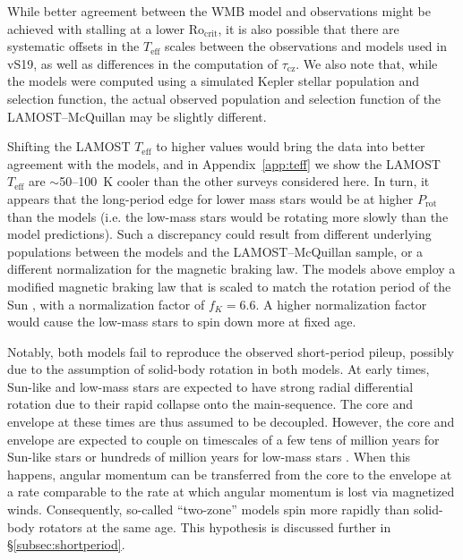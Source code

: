 \documentclass[trackchanges,twocolumn]{aastex631}
\newcommand{\taucz}{$\tau_\mathrm{cz}$\xspace}
\newcommand{\rocrit}{$\mathrm{Ro_{crit}}$\xspace}
\newcommand{\lamostmcq}{LAMOST--McQuillan\xspace}
\newcommand{\jvs}{vS19\xspace}
\newcommand{\teff}{\ensuremath{T_{\mathrm{eff}}}\xspace}
\newcommand{\prot}{\ensuremath{P_\mathrm{rot}}\xspace}
\begin{document}
While better agreement between the WMB model and observations might be achieved with stalling at a lower \rocrit, it is also possible that there are systematic offsets in the \teff scales between the observations and models used in \jvs, as well as differences in the computation of \taucz.  We also note that, while the models were computed using a simulated Kepler stellar population and selection function, the actual observed population and selection function of the \lamostmcq may be slightly different. 

Shifting the LAMOST \teff to higher values would bring the data into better agreement with the models, and in Appendix~\ref{app:teff} we show the LAMOST \teff are $\sim$50--100~K cooler than the other surveys considered here. In turn, it appears that the long-period edge for lower mass stars would be at higher \prot than the models (i.e. the low-mass stars would be rotating more slowly than the model predictions). Such a discrepancy could result from different underlying populations between the models and the \lamostmcq sample, or a different normalization for the magnetic braking law. The models above employ a modified magnetic braking law that is scaled to match the rotation period of the Sun \citep[see equations 1 \& 2 of][]{vanSaders2013}, with a normalization factor of $f_K = 6.6$. A higher normalization factor would cause the low-mass stars to spin down more at fixed age.

Notably, both models fail to reproduce the observed short-period pileup, possibly due to the assumption of solid-body rotation in both models. At early times, Sun-like and low-mass stars are expected to have strong radial differential rotation due to their rapid collapse onto the main-sequence. The core and envelope at these times are thus assumed to be decoupled. However, the core and envelope are expected to couple on timescales of a few tens of million years for Sun-like stars \citep{Denissenkov2010, GalletBouvier2015, Lanzafame2015} or hundreds of million years for low-mass stars \citep{GalletBouvier2015,Lanzafame2015,Somers2016}. When this happens, angular momentum can be transferred from the core to the envelope at a rate comparable to the rate at which angular momentum is lost via magnetized winds. Consequently, so-called ``two-zone'' models \citep{MacGregor1991} spin more rapidly than solid-body rotators at the same age. This hypothesis is discussed further in \S\ref{subsec:shortperiod}.
\end{document}
